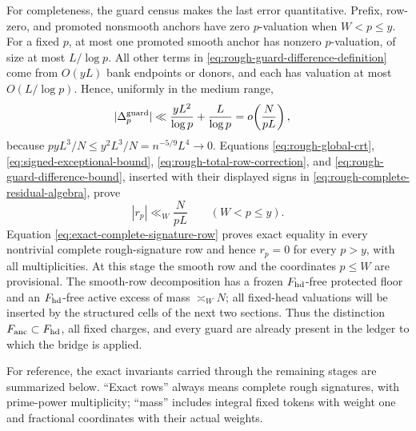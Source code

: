 \documentclass[11pt]{article}
\numberwithin{equation}{section}
\theoremstyle{definition}
\theoremstyle{remark}
\newcommand{\1}{\mathbf 1}
\begin{document}
For completeness, the guard census makes the last error quantitative.
Prefix, row-zero, and promoted nonsmooth anchors have zero \(p\)-valuation
when \(W<p\le y\).  For a fixed \(p\), at most one promoted smooth anchor
has nonzero \(p\)-valuation, of size at most \(L/\log p\).  All other
terms in \eqref{eq:rough-guard-difference-definition} come from
\(O(yL)\) bank endpoints or donors, and each has valuation at most
\(O(L/\log p)\).  Hence, uniformly in the medium range,
\begin{align}
 |\Delta_p^{\rm guard}|
 &\ll \frac{yL^2}{\log p}+\frac L{\log p}
   =o\!\left(\frac{N}{pL}\right),
 \label{eq:rough-guard-difference-bound}
\end{align}
because
\(pyL^3/N\le y^2L^3/N=n^{-5/9}L^4\to0\).
Equations \eqref{eq:rough-global-crt},
\eqref{eq:signed-exceptional-bound},
\eqref{eq:rough-total-row-correction}, and
\eqref{eq:rough-guard-difference-bound}, inserted with their displayed
signs in \eqref{eq:rough-complete-residual-algebra}, prove
\begin{equation}
 |r_p|\ll_W\frac{N}{pL}\qquad(W<p\le y).
 \label{eq:strict-rate-rough-residual}
\end{equation}
Equation \eqref{eq:exact-complete-signature-row} proves exact equality in
every nontrivial complete rough-signature row and hence \(r_p=0\) for every
\(p>y\), with all multiplicities.  At this stage the smooth row and the
coordinates \(p\le W\) are provisional.  The smooth-row decomposition has
a frozen \(F_{\rm hd}\)-free protected floor and an \(F_{\rm hd}\)-free
active excess of mass \(\asymp_WN\); all fixed-head valuations will be
inserted by the structured cells of the next two sections.  Thus the
distinction \(F_{\rm anc}\subset F_{\rm hd}\), all fixed charges, and every
guard are already present in the ledger to which the bridge is applied.

For reference, the exact invariants carried through the remaining stages
are summarized below.  ``Exact rows'' always means complete rough
signatures, with prime-power multiplicity; ``mass'' includes integral
fixed tokens with weight one and fractional coordinates with their actual
weights.
\end{document}
